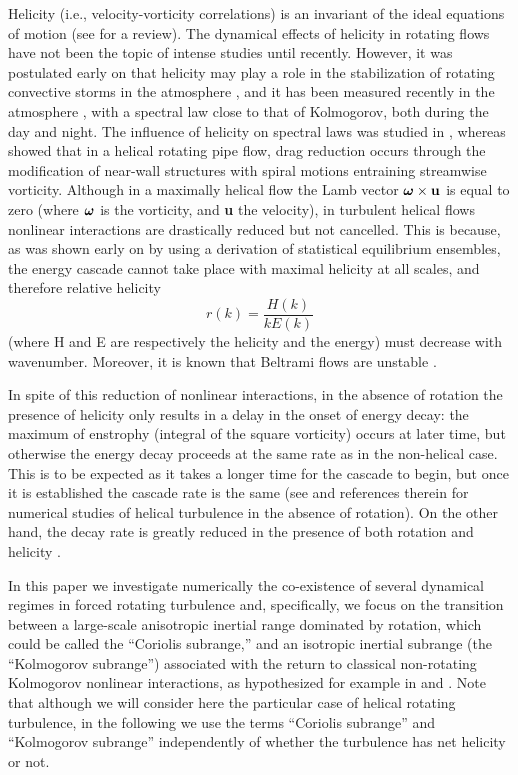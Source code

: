 \documentclass[aps,amsmath,amssymb,floatfix,showpacs]{revtex4}
\begin{document}
Helicity (i.e., velocity-vorticity correlations) is an invariant of the ideal equations of motion  (see \citealt{moffatt_tsinober} for a review). The dynamical effects of helicity in rotating flows have not been the topic of intense studies until recently. However, it was postulated early on that helicity may play a role in the stabilization of rotating convective storms in the atmosphere \citep{lilly}, and it has been measured recently in the atmosphere \citep{koprov}, with a spectral  law close to that of Kolmogorov, both during the day and night. The influence of helicity on spectral laws was studied in \cite{chakra07}, whereas \cite{orlandi} showed that in a helical rotating pipe flow, drag reduction occurs through the modification of near-wall structures with spiral motions entraining streamwise vorticity. Although in a maximally helical flow the Lamb vector {$\mbox{\boldmath $\omega$} \times {\bf u}$ is equal to zero (where $\mbox{\boldmath $\omega$}$ is the vorticity, and {\bf u} the velocity)}, in turbulent helical flows nonlinear interactions are drastically reduced but not cancelled. This is because, as was shown early on by \cite{rhk} using a derivation of statistical equilibrium ensembles, the energy cascade cannot take place with maximal helicity at all scales, and therefore relative helicity 
\begin{equation}
r(k) = \frac{H(k)}{kE(k)}
\end{equation}
(where H and E are respectively the helicity and the energy) must decrease with wavenumber. Moreover, it is known that Beltrami flows are unstable \citep[see, e.g.,][]{podvigina}.

In spite of this reduction of nonlinear interactions, in the absence of rotation the presence of helicity only results in a delay in the onset of energy decay: the maximum of enstrophy (integral of the square vorticity) occurs at later time, but otherwise the energy decay proceeds at the same rate as in the non-helical case. This is to be expected as it takes a longer time for the cascade to begin, but once it is established the cascade rate is the same (see \citealt{chen} and references therein for numerical studies of helical turbulence in the absence of rotation). On the other hand, the decay rate is greatly reduced in the presence of both rotation and helicity \citep{teitelbaum}.

In this paper we investigate numerically the co-existence of several dynamical regimes in forced rotating turbulence and, specifically, we focus on the transition between a large-scale anisotropic inertial range dominated by rotation, which could be called the ``Coriolis subrange,'' and an isotropic inertial subrange (the ``Kolmogorov subrange'') associated with the return to classical non-rotating Kolmogorov nonlinear interactions, as hypothesized for example in \cite{zeman} and \cite{canuto}. {Note that although we will consider here the particular case of helical rotating turbulence, in the following we use the terms ``Coriolis subrange'' and ``Kolmogorov subrange'' independently of whether the turbulence has net helicity or not.}
\end{document}
